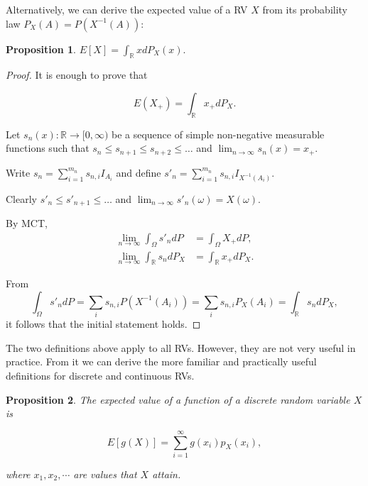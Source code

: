 \documentclass{book}
\theoremstyle{plain}%
\newtheorem{proposition}{Proposition}[section]
\theoremstyle{definition}
\newlength{\arrow}
\begin{document}
Alternatively, we can derive the expected value of a RV $X$ from its probability law $P_X(A) = P(X^{-1}(A))$:

\begin{proposition}
$E[X] = \int_{\mathbb{R}} x dP_X(x).$\label{prop:exp_law}
\end{proposition}

\begin{proof}

It is enough to prove that 

$$E(X_+) = \int_\mathbb{R} x_+ dP_X.$$

Let $s_n(x): \mathbb{R} \rightarrow [0, \infty)$ be a sequence of simple non-negative measurable functions such that $s_n \leq s_{n+1} \leq s_{n+2} \leq \dots$ and $\lim_{n\rightarrow\infty}s_n(x)= x_+
$. 

Write $s_n = \sum_{i=1}^{m_n} s_{n,i} I_{A_i}$ and define $s'_n = \sum_{i=1}^{m_n} s_{n,i} I_{X^{-1}(A_i)}$.

Clearly $s'_n \leq s'_{n+1} \leq \dots$ and $\lim_{n\rightarrow\infty}s'_n(\omega)= X(\omega)$.

By MCT,
\begin{align*}
	\lim_{n \rightarrow \infty} \int_\Omega s'_n dP 
		&= \int_\Omega X_+ dP,\\
	\lim_{n \rightarrow \infty} \int_\mathbb{R} s_n dP_X 
		&= \int_\mathbb{R} x_+ dP_X.
\end{align*}

From 
$$\int_\Omega s'_n dP = \sum_{i} s_{n,i} P(X^{-1}(A_i)) = \sum_{i} s_{n,i} P_X(A_i) = \int_\mathbb{R} s_n dP_X,$$
it follows that the initial statement holds.

\end{proof}

The two definitions above apply to all RVs. However, they are not very useful in practice. From it we can derive the more familiar and practically useful definitions for discrete and continuous RVs.

\begin{proposition}
The expected value of a function of a discrete random variable $X$ is

$$E[g(X)] = \sum_{i=1}^\infty g(x_i) p_X(x_i),$$

where $x_1, x_2, \cdots$ are values that $X$ attain.
\end{proposition}
\end{document}
